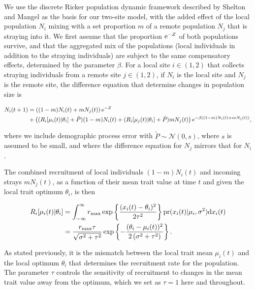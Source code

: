 \documentclass[onecolumn,preprintnumbers,amsmath,amssymb,superscriptaddress]{revtex4}
\begin{document}
We use the discrete Ricker population dynamic framework described by Shelton and Mangel \cite{} as the basis for our two-site model, with the added effect of the local population $N_i$ mixing with a set proportion $m$ of a remote population $N_j$ that is straying into it.
We first assume that the proportion ${\rm e}^{-Z}$ of both populations survive, and that the aggregated mix of the populations (local individuals in addition to the straying individuals) are subject to the same compensatory effects, determined by the parameter $\beta$.
For a local site $i\in(1,2)$ that collects straying individuals from a remote site $j\in(1,2)$, if $N_i$ is the local site and $N_j$ is the remote site, the difference equation that determine changes in population size is

\begin{align}
  N_i(t+1) &= \left((1-m)N_i(t) + m N_j(t) \right){\rm e}^{-Z} \\ \nonumber
  &+ \left((R_i[\mu_i(t)|\theta_i]+\tilde{P}) (1-m)N_i(t) + (R_i[\mu_j(t)|\theta_i]+\tilde{P}) m N_j(t)\right) {\rm e}^{-\beta ((1-m)N_i(t) + m N_j(t))},
\end{align}

\noindent where we include demographic process error with $\tilde{P}\sim \mathcal{N}(0,s)$, where $s$ is assumed to be small, and where the difference equation for $N_j$ mirrors that for $N_i$.

The combined recruitment of local individuals $(1-m)N_i(t)$ and incoming strays $mN_j(t)$, as a function of their mean trait value at time $t$ and given the local trait optimum $\theta_i$, is then

\begin{align}
  R_i[\mu_i(t)|\theta_i] &= \int_{-\infty}^\infty r_{\rm max}\exp\left\{\frac{(x_i(t)-\theta_i)^2}{2\tau^2}\right\} {\rm pr}(x_i(t)|\mu_i,\sigma^2) {\rm d}x_i(t) \\ \nonumber
  &= \frac{r_{\rm max} \tau  }{\sqrt{\sigma ^2+\tau ^2}}\exp\left\{-\frac{(\theta_i-\mu_i(t))^2}{2 \left(\sigma ^2+\tau ^2\right)}\right\}.
\end{align}

\noindent As stated previously, it is the mismatch between the local trait mean $\mu_i(t)$ and the local optimum $\theta_i$ that determines the recruitment rate for the population.
The parameter $\tau$ controls the sensitivity of recruitment to changes in the mean trait value away from the optimum, which we set as $\tau=1$ here and throughout.
\end{document}
